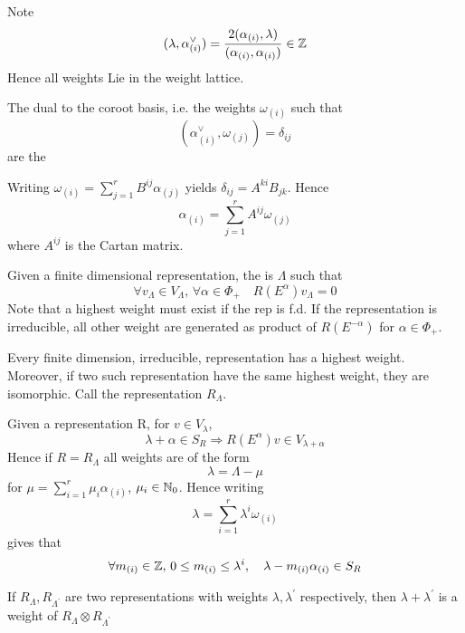 \documentclass{article}
\begin{document}
\begin{theorem}
	Note 
	\[
	(\lambda, \alpha^\vee_{(i)})=\frac{2(\alpha_{(i)},\lambda)}{(\alpha_{(i)},\alpha_{(i)})} \in \mathbb{Z}
	\]
	Hence all weights Lie in the weight lattice. 
\end{theorem}

\begin{definition}
	The dual to the coroot basis, i.e. the weights $\omega_{(i)}$ such that 
	\[
	(\alpha^\vee_{(i)}, \omega_{(j)})=\delta_{ij}
	\]
	are the 
\end{definition}

\begin{fact}
	Writing $\omega_{(i)}=\sum_{j=1}^r B^{ij} \alpha_{(j)}$ yields $\delta_{ij}=A^{ki}B_{jk}$. Hence 
	\[
	\alpha_{(i)}=\sum_{j=1}^r A^{ij} \omega_{(j)}
	\]
	where $A^{ij}$ is the Cartan matrix. 
\end{fact}

\begin{definition}
	Given a finite dimensional representation, the  is $\Lambda$ such that 
	\[
	\forall v_\Lambda\in V_\Lambda, \, \forall \alpha\in\Phi_+ \quad R(E^\alpha)v_\Lambda=0
	\]
	Note that a highest weight must exist if the rep is f.d. If the representation is irreducible, all other weight are generated as product of $R(E^{-\alpha})$ for $\alpha\in\Phi_+$. 
\end{definition}

\begin{theorem}
	Every finite dimension, irreducible, representation has a highest weight. Moreover, if two such representation have the same highest weight, they are isomorphic. Call the representation $R_\Lambda$. 
\end{theorem}

\begin{fact}
	Given a representation R, for $v\in V_\lambda$, 
	\[
	\lambda+\alpha\in S_R \Rightarrow R(E^\alpha)v \in V_{\lambda+\alpha}
	\]
	Hence if $R=R_\Lambda$ all weights are of the form 
	\[
	\lambda=\Lambda-\mu
	\]
	for $\mu=\sum_{i=1}^r \mu_i \alpha_{(i)}$, $\mu_i\in\mathbb{N}_0$. Hence writing 
	\[
	\lambda=\sum_{i=1}^r \lambda^i \omega_{(i)}
	\]
	gives that
	\[
	\forall m_{(i)}\in\mathbb{Z}, \, 0\leq m_{(i)}\leq \lambda^i, \quad \lambda-m_{(i)}\alpha_{(i)}\in S_R
	\]
\end{fact}

\begin{lemma}
	If $R_\Lambda, R_{\Lambda^\prime}$ are two representations with weights $\lambda,\lambda^\prime$ respectively, then $\lambda+\lambda^\prime$ is a weight of $R_\Lambda \otimes R_{\Lambda^\prime}$
\end{lemma}



\end{document}
